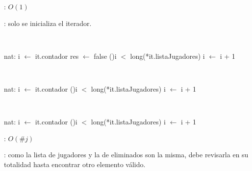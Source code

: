 \begin{Algoritmos}
	\complejidad: $O(1)$

	\justifcomp: solo se inicializa el iterador.

	~

	\begin{algorithm}[H]
		\NoCaptionOfAlgo
		\caption{}
		nat: i $\leftarrow$ it.contador
		res $\leftarrow$ false
		\While(){i $<$ long(*it.listaJugadores)}{
			i $\leftarrow$ i + 1
		}
	\end{algorithm}

	~

	\begin{algorithm}[H]
		\NoCaptionOfAlgo
		\caption{}
		nat: i $\leftarrow$ it.contador
		\While(){i $<$ long(*it.listaJugadores)}{
			i $\leftarrow$ i + 1
		}
	\end{algorithm}

	~

	\begin{algorithm}[H]
		\NoCaptionOfAlgo
		\caption{}
		nat: i $\leftarrow$ it.contador
		\While(){i $<$ long(*it.listaJugadores)}{
			i $\leftarrow$ i + 1
		}
	\end{algorithm}

	\complejidad: $O(\#j)$

	\justifcomp: como la lista de jugadores y la de eliminados son la misma, debe revisarla en su totalidad hasta encontrar otro elemento válido.

	~


\end{Algoritmos}
